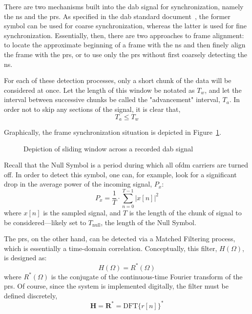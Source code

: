 \documentclass[class=report,11pt,crop=false]{standalone}
\begin{document}
There are two mechanisms built into the \gls{dab} signal for synchronization, namely the \acrfull{ns} and the \acrfull{prs}. As specified in the \gls{dab} standard document~\cite{dabstandard}, the former symbol can be used for coarse synchronization, whereas the latter is used for fine synchronization. Essentially, then, there are two approaches to frame alignment: to locate the approximate beginning of a frame with the \gls{ns} and then finely align the frame with the \gls{prs}, or to use only the \gls{prs} without first coarsely detecting the \gls{ns}.

For each of these detection processes, only a short chunk of the data will be considered at once. Let the length of this window be notated as \(T_w\), and let the interval between successive chunks be called the "advancement" interval, \(T_a\). In order not to skip any sections of the signal, it is clear that,
\begin{equation}
  T_a \le T_w
\end{equation}

Graphically, the frame synchronization situation is depicted in Figure~\ref{fig:sliding-window-illustration}.

\begin{figure}[htbp]
  \centering
  \captionsetup{type=figure}
  \def\svgwidth{\linewidth}
  { %
      }
      \caption{Depiction of sliding window across a recorded \gls{dab} signal}
      \label{fig:sliding-window-illustration}
\end{figure}


Recall that the Null Symbol is a period during which all \gls{ofdm} carriers are turned off. In order to detect this symbol, one can, for example, look for a significant drop in the average power of the incoming signal, \(P_x\):
\begin{equation}
  P_x = \frac{1}{T} \cdot \sum^{T-1}_{n=0} \Big| x[n] \Big|^2
\end{equation}
where \(x[n]\) is the sampled signal, and \(T\) is the length of the chunk of signal to be considered---likely set to \(T_\textrm{null}\), the length of the Null Symbol.

The \gls{prs}, on the other hand, can be detected via a Matched Filtering process, which is essentially a time-domain correlation. Conceptually, this filter, \(H(\Omega)\), is designed as:
\begin{equation}
  H(\Omega) = R^*(\Omega)
\end{equation}
where \(R^*(\Omega)\) is the conjugate of the continuous-time Fourier transform of the \gls{prs}. Of course, since the system is implemented digitally, the filter must be defined discretely,
\begin{equation}
  \mathbf{H} = \mathbf{R}^* = \mathrm{DFT} \{ r[n] \}^*
\end{equation}
\end{document}
